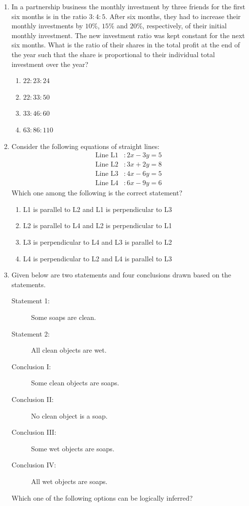 \documentclass[a4paper,10pt]{article}
\begin{document}
\begin{enumerate}
\item In a partnership business the monthly investment by three friends for the first six months is in the ratio $3 \colon 4 \colon 5$. After six months, they had to increase their monthly investments by $10\%$, $15\%$ and $20\%$, respectively, of their initial monthly investment. The new investment ratio was kept constant for the next six months.
What is the ratio of their shares in the total profit  at the end of the year such that the share is proportional to their individual total investment over the year?

\hfill{}
\begin{enumerate}
	\item $22 \colon 23 \colon 24$
	\item $22 \colon 33 \colon 50$
	\item $33 \colon 46 \colon 60$
	\item $63 \colon 86 \colon 110$
\end{enumerate}

\item Consider the following equations of straight lines:
\begin{align*}
	\text{Line L1} &\colon 2x - 3y = 5 \\
	\text{Line L2} &\colon 3x + 2y = 8 \\
	\text{Line L3} &\colon 4x - 6y = 5 \\
	\text{Line L4} &\colon 6x - 9y = 6
\end{align*}
Which one among the following is the correct statement?

\hfill{}
\begin{enumerate}
	\item L1 is parallel to L2 and L1 is perpendicular to L3
	\item L2 is parallel to L4 and L2 is perpendicular to L1
	\item L3 is perpendicular to L4 and L3 is parallel to L2
	\item L4 is perpendicular to L2 and L4 is parallel to L3
\end{enumerate}

\item Given below are two statements and four conclusions drawn based on the statements.
\begin{description}
	\item[Statement 1:] Some soaps are clean.
	\item[Statement 2:] All clean objects are wet.
\end{description}
\begin{description}
	\item[Conclusion I:] Some clean objects are soaps.
	\item[Conclusion II:] No clean object is a soap.
	\item[Conclusion III:] Some wet objects are soaps.
	\item[Conclusion IV:] All wet objects are soaps.
\end{description}
Which one of the following options can be logically inferred?


\end{enumerate}
\end{document}

